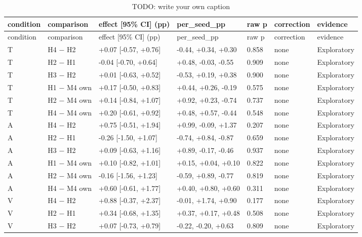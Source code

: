 {\scriptsize
\begin{longtable}{lllllll}
\caption{TODO: write your own caption}\label{tab:T08a-classifier-adaptation-mosei} \\
\toprule
condition & comparison & effect [95\% CI] (pp) & per\_\allowbreak{}seed\_\allowbreak{}pp & raw p & correction & evidence \\
\midrule
\endfirsthead
\toprule
condition & comparison & effect [95\% CI] (pp) & per\_\allowbreak{}seed\_\allowbreak{}pp & raw p & correction & evidence \\
\midrule
\endhead
\bottomrule
\endfoot
T & H4 $-$ H2 & +0.07 [-0.57, +0.76] & -0.44, +0.34, +0.30 & 0.858 & none & Exploratory \\
T & H2 $-$ H1 & -0.04 [-0.70, +0.64] & +0.48, -0.03, -0.55 & 0.909 & none & Exploratory \\
T & H3 $-$ H2 & +0.01 [-0.63, +0.52] & -0.53, +0.19, +0.38 & 0.900 & none & Exploratory \\
T & H1 $-$ M4 own & +0.17 [-0.50, +0.83] & +0.44, +0.26, -0.19 & 0.575 & none & Exploratory \\
T & H2 $-$ M4 own & +0.14 [-0.84, +1.07] & +0.92, +0.23, -0.74 & 0.737 & none & Exploratory \\
T & H4 $-$ M4 own & +0.20 [-0.61, +0.92] & +0.48, +0.57, -0.44 & 0.548 & none & Exploratory \\
A & H4 $-$ H2 & +0.75 [-0.51, +1.94] & +0.99, -0.09, +1.37 & 0.207 & none & Exploratory \\
A & H2 $-$ H1 & -0.26 [-1.50, +1.07] & -0.74, +0.84, -0.87 & 0.659 & none & Exploratory \\
A & H3 $-$ H2 & +0.09 [-0.63, +1.16] & +0.89, -0.17, -0.46 & 0.937 & none & Exploratory \\
A & H1 $-$ M4 own & +0.10 [-0.82, +1.01] & +0.15, +0.04, +0.10 & 0.822 & none & Exploratory \\
A & H2 $-$ M4 own & -0.16 [-1.56, +1.23] & -0.59, +0.89, -0.77 & 0.819 & none & Exploratory \\
A & H4 $-$ M4 own & +0.60 [-0.61, +1.77] & +0.40, +0.80, +0.60 & 0.311 & none & Exploratory \\
V & H4 $-$ H2 & +0.88 [-0.37, +2.37] & -0.01, +1.74, +0.90 & 0.177 & none & Exploratory \\
V & H2 $-$ H1 & +0.34 [-0.68, +1.35] & +0.37, +0.17, +0.48 & 0.508 & none & Exploratory \\
V & H3 $-$ H2 & +0.07 [-0.73, +0.79] & -0.22, -0.20, +0.63 & 0.809 & none & Exploratory \\

\end{longtable}}
